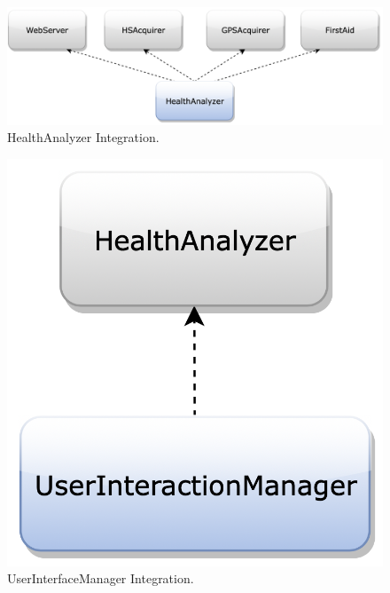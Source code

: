 \begin{figure}[H]
\centering
\includegraphics[scale=0.35]{Images/IntegrationPlanImages/fig11.png}
\caption{HealthAnalyzer Integration.}
\vspace{0.8cm}
\end{figure}
\bigbreak
\begin{figure}[H]
\begin{center}
        \begin{minipage}[c]{.40\textwidth}
	\centering
\includegraphics[scale=0.35,valign=t]{Images/IntegrationPlanImages/fig12.png}
\caption{UserInterfaceManager Integration.}
        \end{minipage}%
        \hspace{10mm}%
        \begin{minipage}[c]{.40\textwidth}
	\centering

\end{minipage}
\end{center}
\end{figure}
